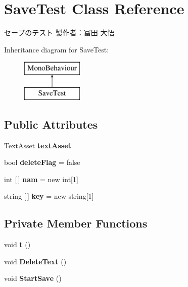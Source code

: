 \hypertarget{class_save_test}{}\section{Save\+Test Class Reference}
\label{class_save_test}


セーブのテスト 製作者：冨田 大悟  


Inheritance diagram for Save\+Test\+:\begin{figure}[H]
\begin{center}
\leavevmode
\includegraphics[height=2.000000cm]{class_save_test}
\end{center}
\end{figure}
\subsection*{Public Attributes}
\begin{DoxyCompactItemize}
\item 
\mbox{\label{class_save_test_a3014dcf35873cee387d41de37eb0ffd8}} 
Text\+Asset {\bfseries text\+Asset}
\item 
\mbox{\label{class_save_test_a2e1a2885d59bac6c85437f1f2915fd9f}} 
bool {\bfseries delete\+Flag} = false
\item 
\mbox{\label{class_save_test_ab68a2edebbb3c1d96458c82e2e62098d}} 
int \mbox{[}$\,$\mbox{]} {\bfseries nam} = new int\mbox{[}1\mbox{]}
\item 
\mbox{\label{class_save_test_a5607c0deda9da896fd6da3e33e5d6e8a}} 
string \mbox{[}$\,$\mbox{]} {\bfseries key} = new string\mbox{[}1\mbox{]}
\end{DoxyCompactItemize}
\subsection*{Private Member Functions}
\begin{DoxyCompactItemize}
\item 
\mbox{\label{class_save_test_aa3d0657a7e78fda521280cfe65c9ff5b}} 
void {\bfseries t} ()
\item 
\mbox{\label{class_save_test_a68443f3983ae099f72bab7a265ab0c8e}} 
void {\bfseries Delete\+Text} ()
\item 
\mbox{\label{class_save_test_a81e25a7552a5a1fed5dac5722a22ec4f}} 
void {\bfseries Start\+Save} ()
\end{DoxyCompactItemize}


